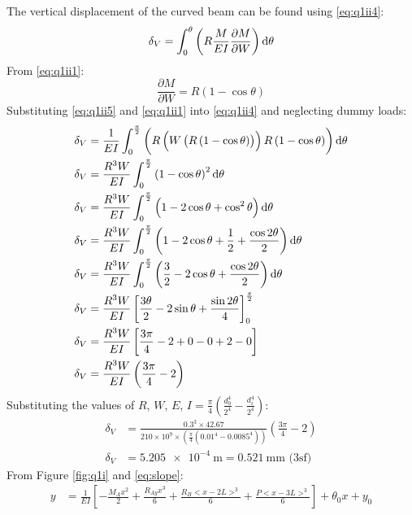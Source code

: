 \documentclass[11pt]{article}
\numberwithin{equation}{section}
\begin{document}
The vertical displacement of the curved beam can be found using \ref{eq:q1ii4}:
\begin{equation}
    \delta_V = \int_0^{\theta} \left(R\frac{M}{EI}\frac{\partial M}{\partial W}\right)\dif \theta \label{eq:q1ii4}
\end{equation}
From \ref{eq:q1ii1}:
\begin{equation}
    \frac{\partial M}{\partial W} = R\left(1-\cos\theta\right) \label{eq:q1ii5}
\end{equation}
Substituting \ref{eq:q1ii5} and \ref{eq:q1ii1} into \ref{eq:q1ii4} and neglecting dummy loads:
\begin{align}
    \delta_V &= \frac{1}{EI}\int_0^{\frac{\pi}{2}} \left(R\left(W\left(R\left(1-\cos\theta\right)\right)\right)R\left(1-\cos\theta\right)\right)\dif \theta\\
    \delta_V &= \frac{R^3W}{EI}\int_0^{\frac{\pi}{2}} \left(1-\cos\theta\right)^2\dif \theta\\
    \delta_V &= \frac{R^3W}{EI}\int_0^{\frac{\pi}{2}} \left(1-2\cos\theta + \cos^2\theta\right)\dif \theta\\
    \delta_V &= \frac{R^3W}{EI}\int_0^{\frac{\pi}{2}} \left(1-2\cos\theta + \frac{1}{2} + \frac{\cos 2\theta}{2}\right)\dif \theta\\
    \delta_V &= \frac{R^3W}{EI}\int_0^{\frac{\pi}{2}} \left(\frac{3}{2}-2\cos\theta + \frac{\cos 2\theta}{2}\right)\dif \theta\\
    \delta_V &= \frac{R^3W}{EI}\left[\frac{3\theta}{2}-2\sin\theta + \frac{\sin 2\theta}{4}\right]_0^{\frac{\pi}{2}}\\
    \delta_V &= \frac{R^3W}{EI}\left[\frac{3\pi}{4} -2 + 0 - 0 + 2 - 0\right]\\
    \delta_V &= \frac{R^3W}{EI}\left(\frac{3\pi}{4}-2\right)
\end{align}
Substituting the values of $R$, $W$, $E$, $I = \frac{\pi}{4}\left(\frac{d_0^4}{2^4}-\frac{d_i^4}{2^4}\right)$:
\begin{align}
    \delta_V &= \frac{0.3^3\times 42.67}{210\times 10^9 \times \left(\frac{\pi}{4}\left(0.01^4 - 0.0085^4\right)\right)}\left(\frac{3\pi}{4}-2\right)\\
    \delta_V &= \SI{5.205e-4}{\meter} = \SI{0.521}{\milli \meter} \textrm{ (3sf)}
\end{align}
From Figure \ref{fig:q1i} and \ref{eq:slope}:
\begin{align}
    y &= \frac{1}{EI} \left[-\frac{M_A x^2}{2} + \frac{R_{Ay}x^3}{6} + \frac{R_B<x- 2L>^3}{6} + \frac{P<x-3L>^3}{6}\right] + \theta_0 x +y_0
\end{align}
\end{document}
